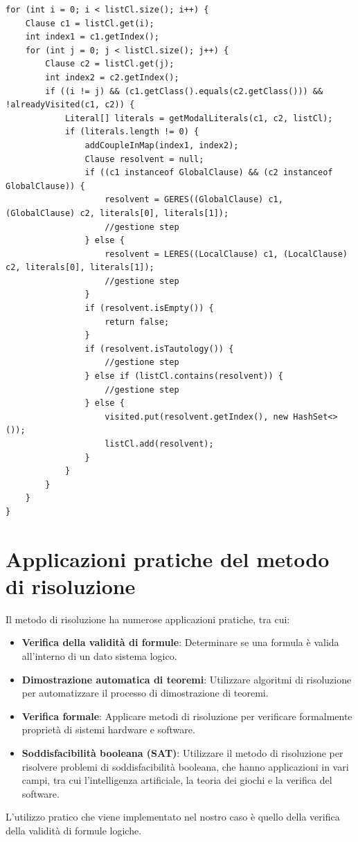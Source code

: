 \documentclass[a4paper,12pt]{report}
\begin{document}
\begin{minipage}{\linewidth}
    \small
    \begin{lstlisting}[caption={cicli for innestati per l'esecuzione delle regole LERES e GERES nel metodo \texttt{isSatisfiable}}, label={method:isSatisfiable}]
for (int i = 0; i < listCl.size(); i++) {
    Clause c1 = listCl.get(i);
    int index1 = c1.getIndex();
    for (int j = 0; j < listCl.size(); j++) {
        Clause c2 = listCl.get(j);
        int index2 = c2.getIndex();
        if ((i != j) && (c1.getClass().equals(c2.getClass())) && !alreadyVisited(c1, c2)) {
            Literal[] literals = getModalLiterals(c1, c2, listCl);
            if (literals.length != 0) {
                addCoupleInMap(index1, index2);
                Clause resolvent = null;
                if ((c1 instanceof GlobalClause) && (c2 instanceof GlobalClause)) {
                    resolvent = GERES((GlobalClause) c1, (GlobalClause) c2, literals[0], literals[1]);
                    //gestione step
                } else {
                    resolvent = LERES((LocalClause) c1, (LocalClause) c2, literals[0], literals[1]);
                    //gestione step
                } 
                if (resolvent.isEmpty()) {
                    return false;
                }
                if (resolvent.isTautology()) {
                    //gestione step
                } else if (listCl.contains(resolvent)) {
                    //gestione step
                } else {
                    visited.put(resolvent.getIndex(), new HashSet<>());
                    listCl.add(resolvent);
                }
            }
        }
    }
}
    \end{lstlisting}
\end{minipage}

% 
% 
\chapter{Applicazioni pratiche del metodo di risoluzione}
\label{app}
Il metodo di risoluzione ha numerose applicazioni pratiche, tra cui:
\begin{itemize}
    \item \textbf{Verifica della validità di formule}: Determinare se una formula è valida all'interno di un dato sistema logico.
    \item \textbf{Dimostrazione automatica di teoremi}: Utilizzare algoritmi di risoluzione per automatizzare il processo di dimostrazione di teoremi.
    \item \textbf{Verifica formale}: Applicare metodi di risoluzione per verificare formalmente proprietà di sistemi hardware e software.
    \item \textbf{Soddisfacibilità booleana (SAT)}: Utilizzare il metodo di risoluzione per risolvere problemi di soddisfacibilità booleana, che hanno applicazioni in vari campi, tra cui l'intelligenza artificiale, la teoria dei giochi e la verifica del software.
\end{itemize}
L'utilizzo pratico che viene implementato nel nostro caso è quello della verifica della validità di formule logiche.
\end{document}
